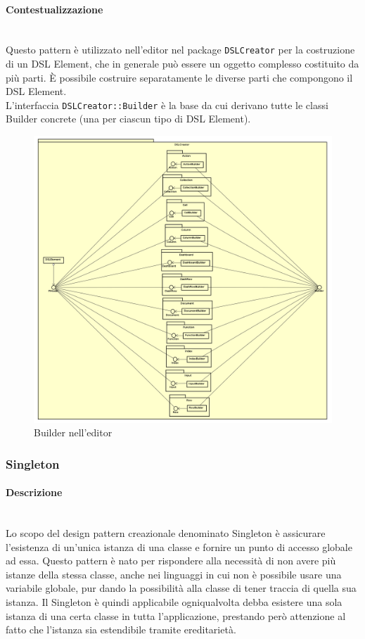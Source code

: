 \paragraph{Contestualizzazione}\mbox{} \\
Questo pattern è utilizzato nell'editor nel package \texttt{DSLCreator} per la costruzione di un DSL Element, che in generale può essere un oggetto complesso costituito da più parti. È possibile costruire separatamente le diverse parti che compongono il DSL Element. \\ L'interfaccia \texttt{DSLCreator::Builder} è la base da cui derivano tutte le classi Builder concrete (una per ciascun tipo di DSL Element).
\begin{figure}[H]
\centering
\includegraphics[width=1.0\textwidth]{res/sections/frontend/builder_editor.png}
\caption{Builder nell'editor}
\end{figure}
\subsubsection{Singleton}
\paragraph{Descrizione} \mbox{} \\
Lo scopo del design pattern creazionale denominato Singleton è assicurare l’esistenza di un'unica istanza di una classe e fornire un punto di accesso globale ad essa. Questo pattern è nato per rispondere alla necessità di non avere più istanze della stessa classe, anche nei linguaggi in cui non è possibile usare una variabile globale, pur dando la possibilità alla classe di tener traccia di quella sua istanza. Il Singleton è quindi applicabile ogniqualvolta debba esistere una sola istanza di una certa classe in tutta l’applicazione, prestando però attenzione al fatto che l’istanza sia estendibile tramite ereditarietà.
